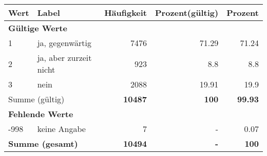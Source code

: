      \begin{longtable}{lXrrr}
     \toprule
     \textbf{Wert} & \textbf{Label} & \textbf{Häufigkeit} & \textbf{Prozent(gültig)} & \textbf{Prozent} \\
     \endhead
     \midrule
     \multicolumn{5}{l}{\textbf{Gültige Werte}}\\

     1 &
     \multicolumn{1}{X}{ ja, gegenwärtig   } &


       \num{7476} &
       \num[round-mode=places,round-precision=2]{71.29} &
         \num[round-mode=places,round-precision=2]{71.24} \\

     2 &
     \multicolumn{1}{X}{ ja, aber zurzeit nicht   } &


       \num{923} &
       \num[round-mode=places,round-precision=2]{8.8} &
         \num[round-mode=places,round-precision=2]{8.8} \\

     3 &
     \multicolumn{1}{X}{ nein   } &


       \num{2088} &
       \num[round-mode=places,round-precision=2]{19.91} &
         \num[round-mode=places,round-precision=2]{19.9} \\
     \midrule
     \multicolumn{2}{l}{Summe (gültig)} &
       \textbf{\num{10487}} &
     \textbf{\num{100}} &
       \textbf{\num[round-mode=places,round-precision=2]{99.93}} \\
     \multicolumn{5}{l}{\textbf{Fehlende Werte}}\\
       -998 &
       keine Angabe &
         \num{7} &
        - &
         \num[round-mode=places,round-precision=2]{0.07} \\
     \midrule
     \multicolumn{2}{l}{\textbf{Summe (gesamt)}} &
          \textbf{\num{10494}} &
        \textbf{-} &
        \textbf{\num{100}} \\
     \bottomrule
     \end{longtable}
     
